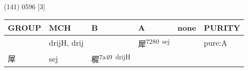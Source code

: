 \documentclass[14pt,a4paper]{scrartcl}
\begin{document}
(141) 0596 {[}3{]}

\begin{longtable}[c]{@{}llllll@{}}
\toprule
\begin{minipage}[b]{0.14\columnwidth}\raggedright\strut
GROUP
\strut\end{minipage} &
\begin{minipage}[b]{0.14\columnwidth}\raggedright\strut
MCH
\strut\end{minipage} &
\begin{minipage}[b]{0.14\columnwidth}\raggedright\strut
B
\strut\end{minipage} &
\begin{minipage}[b]{0.14\columnwidth}\raggedright\strut
A
\strut\end{minipage} &
\begin{minipage}[b]{0.14\columnwidth}\raggedright\strut
none
\strut\end{minipage} &
\begin{minipage}[b]{0.14\columnwidth}\raggedright\strut
PURITY
\strut\end{minipage}\tabularnewline
\midrule
\endhead
\begin{minipage}[t]{0.14\columnwidth}\raggedright\strut
𡱕
\strut\end{minipage} &
\begin{minipage}[t]{0.14\columnwidth}\raggedright\strut
drijH, drij
\strut\end{minipage} &
\begin{minipage}[t]{0.14\columnwidth}\raggedright\strut
\strut\end{minipage} &
\begin{minipage}[t]{0.14\columnwidth}\raggedright\strut
犀\textsuperscript{7280~sej}
\strut\end{minipage} &
\begin{minipage}[t]{0.14\columnwidth}\raggedright\strut
\strut\end{minipage} &
\begin{minipage}[t]{0.14\columnwidth}\raggedright\strut
pure:A
\strut\end{minipage}\tabularnewline
\begin{minipage}[t]{0.14\columnwidth}\raggedright\strut
屖
\strut\end{minipage} &
\begin{minipage}[t]{0.14\columnwidth}\raggedright\strut
sej
\strut\end{minipage} &
\begin{minipage}[t]{0.14\columnwidth}\raggedright\strut
穉\textsuperscript{7a49~drijH}

\end{minipage}
\end{longtable}
\end{document}
